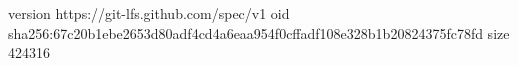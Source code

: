 version https://git-lfs.github.com/spec/v1
oid sha256:67c20b1ebe2653d80adf4cd4a6eaa954f0cffadf108e328b1b20824375fc78fd
size 424316
